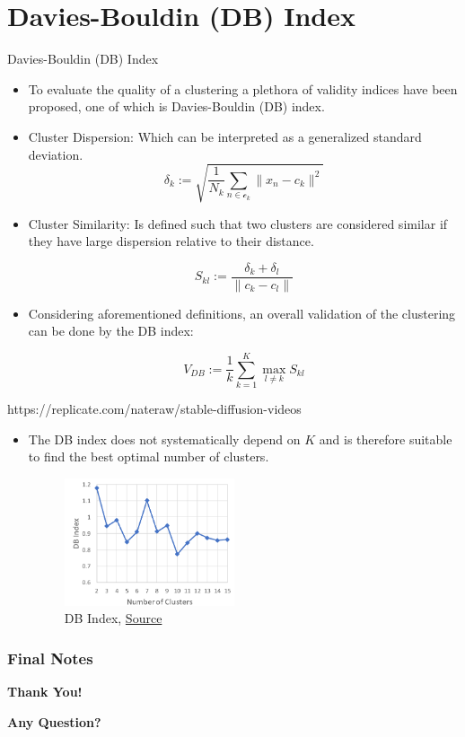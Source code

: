 \documentclass[compress,oilve]{beamer}
\newcommand{\tc}[2]{
	\textcolor{#1}{#2}
}
\begin{document}
\section{Davies-Bouldin (DB) Index}
\begin{frame}{Davies-Bouldin (DB) Index}
	\begin{itemize}
		\item To evaluate the quality of a clustering a plethora of validity indices have been proposed, one of which is Davies-Bouldin (DB) index.
		
		\item \tc{keywords}{Cluster Dispersion:}Which can be interpreted as a generalized standard deviation.
		\begin{equation*}
			\delta_{k} := \sqrt{\frac{1}{N_k}\sum_{n\in\mathcal{c}_k}\|x_n-c_k\|^2}
		\end{equation*}
		
		\medskip
		\item \tc{keywords}{Cluster Similarity:} Is defined such that two clusters are considered similar if they have large dispersion relative to their distance.
		
		\begin{equation*}
			S_{kl} := \frac{\delta_{k}+\delta_{l}}{\| c_k-c_l\|}
		\end{equation*}
	
	
		\medskip
		\item Considering aforementioned definitions, an overall validation of the clustering can be done by the DB index:
		
		\begin{equation*}
			V_{DB} := \frac{1}{k}\sum_{k=1}^{K}\max_{l\neq k}S_{kl}
		\end{equation*}
	\end{itemize}

\end{frame}
\begin{frame}{https://replicate.com/nateraw/stable-diffusion-videos}
	\begin{itemize}
		\item The DB index does not systematically depend on $K$ and is therefore suitable to find the best optimal number of clusters.

		\begin{figure}
		\includegraphics[width=5cm, height=3.75cm]{Figs/5.png}
		\caption{DB Index, \href{https://tinyurl.com/2hyqttw8}{Source}}
	\end{figure}
	\end{itemize}

\end{frame}

\frametitle{Final Notes}
\centering
\vspace{50 pt}
\textbf{Thank You!}
\vspace{50pt}

\textbf{Any Question?}
\end{document}
